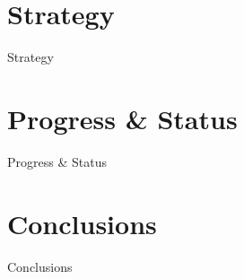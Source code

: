 \documentclass[english,aspectratio=169]{beamer}
\begin{document}
\section{Strategy}
\begin{frame}{Strategy}
\end{frame}

\section{Progress \& Status}
\begin{frame}{Progress \& Status}
\end{frame}

\section{Conclusions}
\begin{frame}{Conclusions}
\end{frame}
\end{document}
